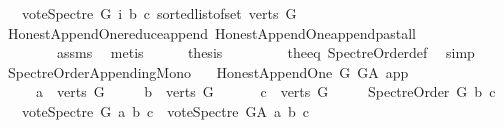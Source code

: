 \begin{isabellebody}
\ \ \ {\isacharparenleft}{\kern0pt}vote{\isacharunderscore}{\kern0pt}Spectre\ G\ i\ b\ c{\isacharparenright}{\kern0pt}{\isacharparenright}{\kern0pt}\ {\isacharparenleft}{\kern0pt}sorted{\isacharunderscore}{\kern0pt}list{\isacharunderscore}{\kern0pt}of{\isacharunderscore}{\kern0pt}set\ {\isacharparenleft}{\kern0pt}verts\ G{\isacharparenright}{\kern0pt}{\isacharparenright}{\kern0pt}{\isacharparenright}{\kern0pt}{\isacharparenright}{\kern0pt}{\isacharparenright}{\kern0pt}{\isacharparenright}{\kern0pt}{\isachardoublequoteclose}\isanewline
\ \ \ \ \ \ \isamarkupfalse%
\ Honest{\isacharunderscore}{\kern0pt}Append{\isacharunderscore}{\kern0pt}One{\isachardot}{\kern0pt}reduce{\isacharunderscore}{\kern0pt}append\ Honest{\isacharunderscore}{\kern0pt}Append{\isacharunderscore}{\kern0pt}One{\isachardot}{\kern0pt}append{\isacharunderscore}{\kern0pt}past{\isacharunderscore}{\kern0pt}all\ \isanewline
\ \ \ \ \ \ \ \ assms{\isacharparenleft}{\kern0pt}{}{\isacharparenright}{\kern0pt}\ \isamarkupfalse%
\ metis\isanewline
\ \ \ \ \isamarkupfalse%
\ {\isacharquery}{\kern0pt}thesis\ \isanewline
\ \ \ \ \ \ \isamarkupfalse%
\ the{\isacharunderscore}{\kern0pt}eq\ Spectre{\isacharunderscore}{\kern0pt}Order{\isacharunderscore}{\kern0pt}def\ \isamarkupfalse%
\ simp\ \isanewline
\ \ \isamarkupfalse%
\isanewline
{}\isamarkupfalse%
%
\endisatagproof
{\isafoldproof}%
%
\isadelimproof
\isanewline
%
\endisadelimproof
\isanewline
{}\isamarkupfalse%
\ Spectre{\isacharunderscore}{\kern0pt}Order{\isacharunderscore}{\kern0pt}Appending{\isacharunderscore}{\kern0pt}Mono{\isacharcolon}{\kern0pt}\isanewline
\ \ \ {\isachardoublequoteopen}Honest{\isacharunderscore}{\kern0pt}Append{\isacharunderscore}{\kern0pt}One\ G\ G{\isacharunderscore}{\kern0pt}A\ app{\isachardoublequoteclose}\isanewline
\ \ \ \ \ {\isachardoublequoteopen}a\ {\isasymin}\ verts\ G{\isachardoublequoteclose}\isanewline
\ \ \ \ \ {\isachardoublequoteopen}b\ {\isasymin}\ verts\ G{\isachardoublequoteclose}\ \isanewline
\ \ \ \ \ {\isachardoublequoteopen}c\ {\isasymin}\ verts\ G{\isachardoublequoteclose}\isanewline
\ \ \ \ \ {\isachardoublequoteopen}Spectre{\isacharunderscore}{\kern0pt}Order\ G\ b\ c{\isachardoublequoteclose}\isanewline
\ \ \ {\isachardoublequoteopen}vote{\isacharunderscore}{\kern0pt}Spectre\ G\ a\ b\ c\ {\isasymle}\ vote{\isacharunderscore}{\kern0pt}Spectre\ G{\isacharunderscore}{\kern0pt}A\ a\ b\ c{\isachardoublequoteclose}\isanewline

\end{isabellebody}
